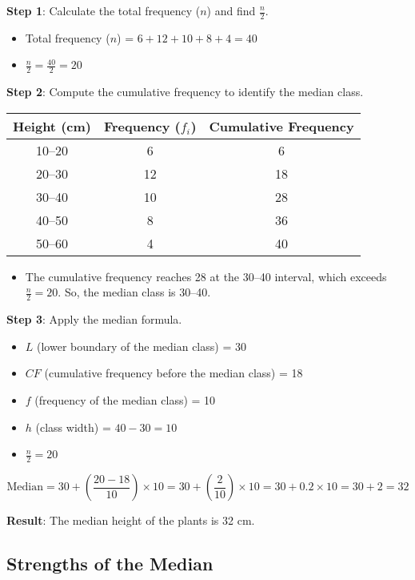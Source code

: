\documentclass[11pt]{article}
\begin{document}
\textbf{Step 1}: Calculate the total frequency ($n$) and find $\frac{n}{2}$.
\begin{itemize}
    \item Total frequency ($n$) = $6 + 12 + 10 + 8 + 4 = 40$
    \item $\frac{n}{2} = \frac{40}{2} = 20$
\end{itemize}

\textbf{Step 2}: Compute the cumulative frequency to identify the median class.

\begin{center}
\begin{tabular}{|c|c|c|}
\hline
\textbf{Height (cm)} & \textbf{Frequency} ($f_i$) & \textbf{Cumulative Frequency} \\
\hline
10--20 & 6 & 6 \\
20--30 & 12 & 18 \\
30--40 & 10 & 28 \\
40--50 & 8 & 36 \\
50--60 & 4 & 40 \\
\hline
\end{tabular}
\end{center}

\begin{itemize}
    \item The cumulative frequency reaches 28 at the 30--40 interval, which exceeds $\frac{n}{2} = 20$. So, the median class is 30--40.
\end{itemize}

\textbf{Step 3}: Apply the median formula.
\begin{itemize}
    \item $L$ (lower boundary of the median class) = 30
    \item $CF$ (cumulative frequency before the median class) = 18
    \item $f$ (frequency of the median class) = 10
    \item $h$ (class width) = $40 - 30 = 10$
    \item $\frac{n}{2} = 20$
\end{itemize}

\[
\text{Median} = 30 + \left( \frac{20 - 18}{10} \right) \times 10 = 30 + \left( \frac{2}{10} \right) \times 10 = 30 + 0.2 \times 10 = 30 + 2 = 32
\]

\textbf{Result}: The median height of the plants is 32 cm.

\subsection*{Strengths of the Median}
\end{document}
